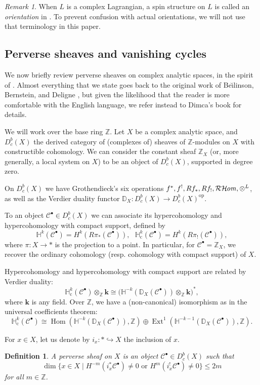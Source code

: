 \documentclass [11pt]{amsart}
\newtheorem {definition}[theorem]{Definition}
\theoremstyle{remark}
\newtheorem {remark}[theorem]{Remark}
\def\zz {{\mathbb{Z}}}
\def\Z {\zz}
\def\HH{\mathbb{H}}
\def\cs{\operatorname{c}}
\def\k{\mathbf{k}}
\def\Hom {\operatorname{Hom}}
\def\Cb {\mathcal{C}^{\bullet}}
\DeclareMathOperator{\sRHom}{\mathcal{RH}\hspace{-1pt}\mathit{om}}
\DeclareMathOperator{\Ext}{\operatorname{Ext}}
\def\DD{\mathbb{D}}
\begin{document}
\begin{remark}
When $L$ is a complex Lagrangian, a spin structure on $L$ is called an {\em orientation} in  \cite[Definition 1.16]{Bussi}. To prevent confusion with actual orientations, we will not use that terminology in this paper.
\end{remark}

\subsection{Perverse sheaves and vanishing cycles}
We now briefly review perverse sheaves on complex analytic spaces, in the spirit of \cite[Section 1.1]{Bussi}. Almost everything that we state goes back to the original work of Be{\u\i}linson,  Bernstein, and Deligne \cite{BBD}, but given the likelihood that the reader is more comfortable with the English language, we refer instead to Dimca's book \cite{Dimca} for details.

We will work over the base ring $\Z$. Let $X$ be a complex analytic space, and $D^b_c(X)$ the derived category of (complexes of) sheaves of $\Z$-modules on $X$ with constructible cohomology. We can consider the constant sheaf $\Z_X$ (or, more generally, a local system on $X$) to be an object of $D^b_c(X)$, supported in degree zero. 

On $D^b_c(X)$ we have Grothendieck's six operations $f^*, f^{!}, Rf_*, Rf_{!}, \sRHom, \otimes^L$, as well as the Verdier duality functor $\DD_X : D^b_c(X) \to D^b_c(X)^{\operatorname{op}}$.

To an object $\Cb \in D^b_c(X)$ we can associate its hypercohomology and hypercohomology with compact support, defined by
$$ \HH^k(\Cb) = H^k(R\pi_* (\Cb)), \ \ \   \HH^k_{\cs}(\Cb) = H^k(R\pi_{!} (\Cb)),$$
where $\pi: X \to *$ is the projection to a point. In particular, for $\Cb=\Z_X$, we recover the ordinary cohomology (resp. cohomology with compact support) of $X$.

Hypercohomology and hypercohomology with compact support are related by Verdier duality:
$$ \HH^k_{\cs}(\Cb) \otimes_{\Z} \k \cong \bigl(\HH^{-k}(\DD_X(\Cb)) \otimes_{\Z} \k\bigr)^*,$$
where $\k$ is any field. Over $\Z$, we have a (non-canonical) isomorphism as in the universal coefficients theorem:
\begin{equation}
\label{eq:Vdual}
\HH^k_{\cs}(\Cb) \cong \Hom(\HH^{-k}(\DD_X(\Cb)), \Z) \oplus \Ext^1(\HH^{-k-1}(\DD_X(\Cb)), \Z).
\end{equation}

For $x \in X$, let us denote by $i_x: * \hookrightarrow X$ the inclusion of $x$. 
\begin{definition}
A {\em perverse sheaf} on $X$ is an object $\Cb \in D^b_c(X)$ such that
$$ \dim \{ x \in X \mid H^{-m}(i_x^*\Cb) \neq 0 \text{ or } H^{m}(i_x^{!}\Cb) \neq 0 \}  \leq 2m$$
for all $m \in \Z$.
\end{definition}
\end{document}

